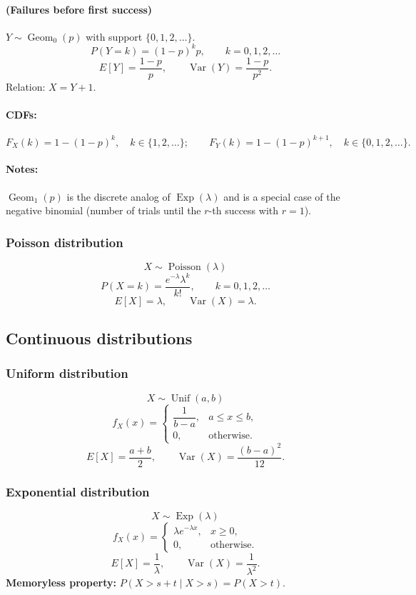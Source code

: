 \documentclass[12pt]{article}
\begin{document}
\paragraph{(Failures before first success) } 
$Y \sim \operatorname{Geom}_0(p)$ with support $\{0,1,2,\ldots\}$.
\[
P(Y=k)=(1-p)^{k}p,\qquad k=0,1,2,\ldots
\]
\[
E[Y]=\frac{1-p}{p},\qquad \operatorname{Var}(Y)=\frac{1-p}{p^{2}}.
\]
Relation: $X=Y+1$.

\paragraph{CDFs:}
\[
F_X(k)=1-(1-p)^{k},\quad k\in\{1,2,\ldots\};\qquad
F_Y(k)=1-(1-p)^{k+1},\quad k\in\{0,1,2,\ldots\}.
\]

\paragraph{Notes:} $\operatorname{Geom}_1(p)$ is the discrete analog of $\operatorname{Exp}(\lambda)$ and is a special case of the negative binomial (number of trials until the $r$-th success with $r=1$).

\subsubsection*{Poisson distribution}
\[
X \sim \operatorname{Poisson}(\lambda)
\]
\[
P(X = k) = \frac{e^{-\lambda} \lambda^k}{k!}, \qquad k = 0,1,2,\dots
\]
\[
E[X] = \lambda, \qquad \operatorname{Var}(X) = \lambda.
\]

\subsection{Continuous distributions}

\subsubsection*{Uniform distribution}
\[
X \sim \operatorname{Unif}(a,b)
\]
\[
f_X(x) = 
\begin{cases}
\dfrac{1}{b - a}, & a \le x \le b,\\
0, & \text{otherwise.}
\end{cases}
\]
\[
E[X] = \dfrac{a + b}{2}, \qquad \operatorname{Var}(X) = \dfrac{(b - a)^2}{12}.
\]

\subsubsection*{Exponential distribution}
\[
X \sim \operatorname{Exp}(\lambda)
\]
\[
f_X(x) = 
\begin{cases}
\lambda e^{-\lambda x}, & x \ge 0,\\
0, & \text{otherwise.}
\end{cases}
\]
\[
E[X] = \dfrac{1}{\lambda}, \qquad \operatorname{Var}(X) = \dfrac{1}{\lambda^2}.
\]
\textbf{Memoryless property:} 
\(P(X > s + t \mid X > s) = P(X > t).\)
\end{document}
